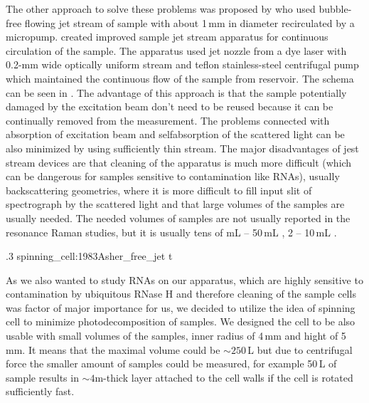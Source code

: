 The other approach to solve these problems was proposed by
\textcite{Ziegler1981} who used bubble-free flowing jet stream of sample with
about 1\,mm in diameter recirculated by a micropump. \textcite{Asher1983}
created improved sample jet stream apparatus for continuous circulation of the
sample. The apparatus used jet nozzle from a dye laser with 0.2-mm wide
optically uniform stream and teflon stainless-steel centrifugal pump which
maintained the continuous flow of the sample from reservoir. The schema can be
seen in . The advantage of this
approach is that the sample potentially damaged by the excitation beam don't
need to be reused because it can be continually removed from the measurement.
The problems connected with absorption of excitation beam and selfabsorption
of the scattered light can be also minimized by using sufficiently thin stream.
The major disadvantages of jest stream devices are that cleaning of the
apparatus is much more difficult (which can be dangerous for samples sensitive
to contamination like RNAs), usually backscattering geometries, where it is
more difficult to fill input slit of spectrograph by the scattered light and
that large volumes of the samples are usually needed. The needed volumes of
samples are not usually reported in the resonance Raman studies, but it
is usually tens of mL -- 50\,mL \parencite{Ziegler1981},
2 -- 10\,mL \parencite{Fodor1985}.

%
{.3}%
{spinning_cell:1983Asher_free_jet}
{t}

As we also wanted to study RNAs on our apparatus, which are highly sensitive
to contamination by ubiquitous RNase H and therefore cleaning of the sample
cells was factor of major importance for us, we decided to utilize the idea
of spinning cell to minimize photodecomposition of samples. We designed the
cell to be also usable with small volumes of the samples, inner radius of 4\,mm
and hight of 5\,mm. It means that the maximal volume could be $\sim250$\,L
but due to centrifugal force the smaller amount of samples could be measured,
for example 50\,L of sample results in $\sim 4$m-thick layer attached
to the cell walls if the cell is rotated sufficiently fast.

